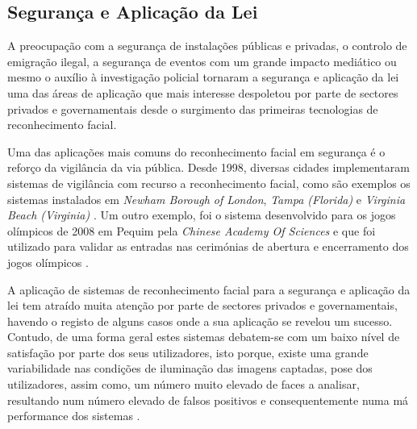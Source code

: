 \subsection{Segurança e Aplicação da Lei} \label{sec:SegurancaAplicaçãoLei}
A preocupação com a segurança de instalações públicas e privadas, o controlo de emigração ilegal, a segurança de eventos com um grande impacto mediático ou mesmo o auxílio à investigação policial tornaram a segurança e aplicação da lei uma das áreas de aplicação que mais interesse despoletou por parte de sectores privados e governamentais desde o surgimento das primeiras tecnologias de reconhecimento facial.

Uma das aplicações mais comuns do reconhecimento facial em segurança é o reforço da vigilância da via pública. Desde 1998, diversas cidades implementaram sistemas de vigilância com recurso a reconhecimento facial, como são exemplos os sistemas instalados em \textit{Newham Borough of London}, \textit{Tampa (Florida)} e \textit{Virginia Beach (Virginia)} \cite{Li2011}.
Um outro exemplo, foi o sistema desenvolvido para os jogos olímpicos de 2008 em Pequim pela \textit{Chinese Academy Of Sciences} e que foi utilizado para validar as entradas nas cerimónias de abertura e encerramento dos jogos olímpicos \cite{ChineseAcademyOfSciences}.

A aplicação de sistemas de reconhecimento facial para a segurança e aplicação da lei tem atraído muita atenção por parte de sectores privados e governamentais, havendo o registo de alguns casos onde a sua aplicação se revelou um sucesso. Contudo, de uma forma geral estes sistemas debatem-se com um baixo nível de satisfação por parte dos seus utilizadores, isto porque, existe uma grande variabilidade nas condições de iluminação das imagens captadas, pose dos utilizadores, assim como, um número muito elevado de faces a analisar, resultando num número elevado de falsos positivos e consequentemente numa má performance dos sistemas \cite{Li2011}.

